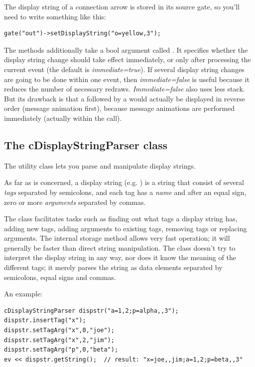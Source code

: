 The display string of a connection arrow
is stored in its source gate, so you'll need to write something
like this:

\begin{verbatim}
gate("out")->setDisplayString("o=yellow,3");
\end{verbatim}

The  methods additionally take a bool
argument called . It specifies whether the display
string change should take effect immediately, or only after processing
the current event (the default is \textit{immediate=true}). If several
display string changes are going to be done within one event, then
\textit{immediate=false} is useful because it reduces the number of
necessary redraws. \textit{Immediate=false} also uses less stack.  But
its drawback is that a  followed by a
 would actually be displayed in reverse order (message
animation first), because message animations are performed immediately
(actually within the  call).


\subsection{The cDisplayStringParser class}

The  utility class lets you parse and
manipulate display strings.

As far as  is concerned, a display string
(e.g. ) is a string that consist of several
\textit{tags} separated by semicolons, and each tag has a \textit{name}
and after an equal sign, zero or more \textit{arguments} separated by commas.

The class facilitates tasks such as finding out what tags a display string
has, adding new tags, adding arguments to existing tags,
removing tags or replacing arguments. The internal storage method allows
very fast operation; it will generally be faster than direct string manipulation.
The class doesn't try to interpret the display string in any way, nor does
it know the meaning of the different tags; it merely parses the string
as data elements separated by semicolons, equal signs and commas.

An example:

\begin{Verbatim}
cDisplayStringParser dispstr("a=1,2;p=alpha,,3");
dispstr.insertTag("x");
dispstr.setTagArg("x",0,"joe");
dispstr.setTagArg("x",2,"jim");
dispstr.setTagArg("p",0,"beta");
ev << dispstr.getString();  // result: "x=joe,,jim;a=1,2;p=beta,,3"
\end{Verbatim}



